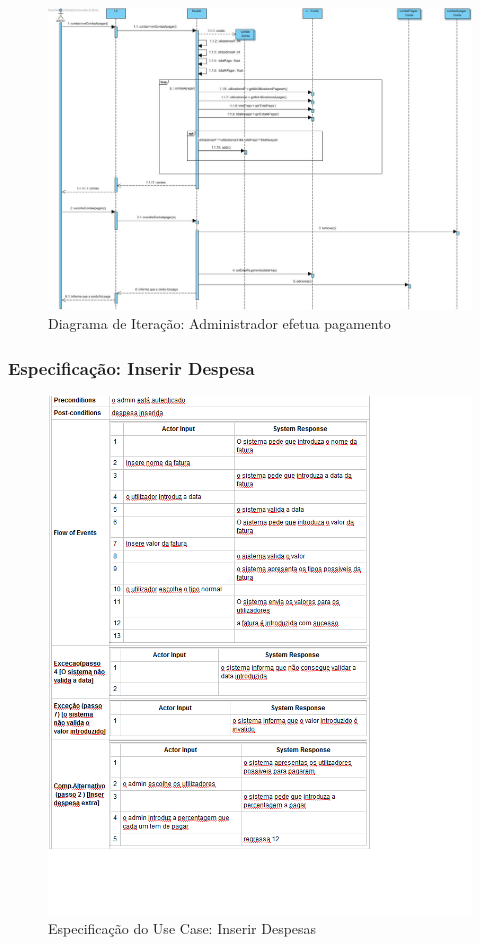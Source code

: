 \begin{figure}[htb!]
	\centering
	\includegraphics[scale=0.345]{imagens/diagramaIt/AdminPagaFactura}  
	\caption{Diagrama de Iteração: Administrador efetua pagamento }  
\end{figure}



\newpage

\subsubsection{Especificação: Inserir Despesa}
\begin{figure}[htb!]
	\centering
	\includegraphics[scale=0.8]{imagens/Especificacoes/inserirdespesas}  
	\caption{Especificação do Use Case: Inserir Despesas}  
\end{figure}

